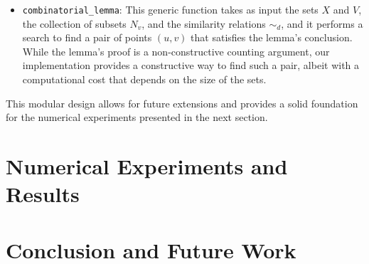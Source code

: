 \documentclass{article}
\begin{document}
\begin{itemize}
    \item \texttt{combinatorial\_lemma}: This generic function takes as input the sets $X$ and $V$, the collection of subsets $N_v$, and the similarity relations $\sim_d$, and it performs a search to find a pair of points $(u, v)$ that satisfies the lemma's conclusion. While the lemma's proof is a non-constructive counting argument, our implementation provides a constructive way to find such a pair, albeit with a computational cost that depends on the size of the sets.
\end{itemize}

This modular design allows for future extensions and provides a solid foundation for the numerical experiments presented in the next section.

\section{Numerical Experiments and Results}

\section{Conclusion and Future Work}



\end{document}
